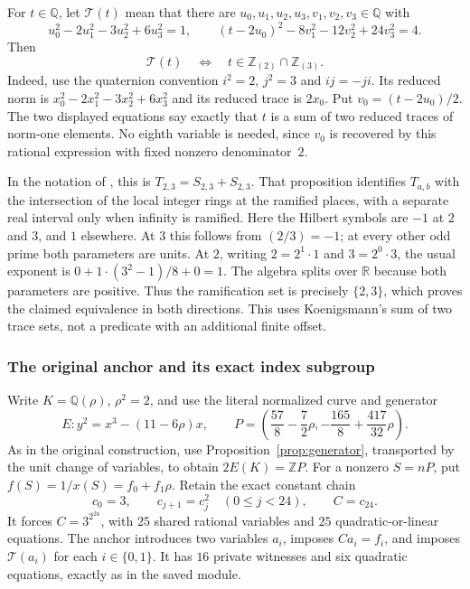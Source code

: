 \documentclass[11pt]{article}
\theoremstyle{definition}
\theoremstyle{remark}
\begin{document}
For $t\in\mathbb Q$, let $\mathcal T(t)$ mean that there are
$u_0,u_1,u_2,u_3,v_1,v_2,v_3\in\mathbb Q$ with
\[
 u_0^2-2u_1^2-3u_2^2+6u_3^2=1,
 \qquad
 (t-2u_0)^2-8v_1^2-12v_2^2+24v_3^2=4.
\]
Then
\[
 \mathcal T(t)\quad\Longleftrightarrow\quad
 t\in\mathbb Z_{(2)}\cap\mathbb Z_{(3)}.
\]
Indeed, use the quaternion convention $i^2=2$, $j^2=3$ and $ij=-ji$.
Its reduced norm is $x_0^2-2x_1^2-3x_2^2+6x_3^2$ and its reduced trace
is $2x_0$. Put $v_0=(t-2u_0)/2$. The two displayed equations say
exactly that $t$ is a sum of two reduced traces of norm-one elements.
No eighth variable is needed, since $v_0$ is recovered by this rational
expression with fixed nonzero denominator~$2$.

In the notation of \cite[Definition~4 and Proposition~6]{koenigsmann-defining},
this is $T_{2,3}=S_{2,3}+S_{2,3}$. That proposition identifies
$T_{a,b}$ with the intersection of the local integer rings at the
ramified places, with a separate real interval only when infinity is
ramified. Here the Hilbert symbols are $-1$ at $2$ and $3$, and $1$
elsewhere. At $3$ this follows from $(2/3)=-1$; at every other odd
prime both parameters are units. At $2$, writing $2=2^1\cdot1$ and
$3=2^0\cdot3$, the usual exponent is
$0+1\cdot(3^2-1)/8+0=1$. The algebra splits over $\mathbb R$ because
both parameters are positive. Thus the ramification set is precisely
$\{2,3\}$, which proves the claimed equivalence in both directions.
This uses Koenigsmann's sum of two trace sets, not a predicate with
an additional finite offset.

\subsubsection{The original anchor and its exact index subgroup}\label{subsec:o8-anchor-subgroup}

Write $K=\mathbb Q(\rho)$, $\rho^2=2$, and use the literal normalized
curve and generator
\[
 E:y^2=x^3-(11-6\rho)x,
 \qquad
 P=\left(\frac{57}{8}-\frac72\rho,
          -\frac{165}{8}+\frac{417}{32}\rho\right).
\]
As in the original construction, use Proposition~\ref{prop:generator}, transported by the unit change
of variables, to obtain $2E(K)=\mathbb ZP$. For a nonzero $S=nP$, put
$f(S)=1/x(S)=f_0+f_1\rho$. Retain the exact constant chain
\[
 c_0=3,\qquad c_{j+1}=c_j^2\quad(0\le j<24),\qquad C=c_{24}.
\]
It forces $C=3^{2^{24}}$, with $25$ shared rational variables and
$25$ quadratic-or-linear equations. The anchor introduces two
variables $a_i$, imposes $Ca_i=f_i$, and imposes $\mathcal T(a_i)$
for each $i\in\{0,1\}$. It has $16$ private witnesses and six
quadratic equations, exactly as in the saved module.
\end{document}
